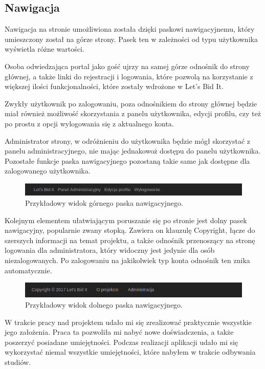 \documentclass[brudnopis]{xmgr}
\begin{document}
\subsection{Nawigacja}

Nawigacja na stronie umożliwiona została dzięki paskowi nawigacyjnemu, który umieszczony został na górze strony. Pasek ten w zależności od typu użytkownika wyświetla różne wartości.

Osoba odwiedzająca portal jako gość ujrzy na samej górze odnośnik do strony głównej, a także linki do rejestracji i logowania, które pozwolą na korzystanie z większej ilości funkcjonalności, które zostały wdrożone w Let's Bid It.

Zwykły użytkownik po zalogowaniu, poza odnośnikiem do strony głównej będzie miał również możliwość skorzystania z panelu użytkownika, edycji profilu, czy też po prostu z opcji wylogowania się z aktualnego konta.

Administrator strony, w odróżnieniu do użytkownika będzie mógł skorzystać z panelu administracyjnego, nie mając jednakowoż dostępu do panelu użytkownika. Pozostałe funkcje paska nawigacyjnego pozostaną takie same jak dostępne dla zalogowanego użytkownika.

\begin{figure}[!tbh]
\centering
\includegraphics[width=\linewidth]{fig/pasek}
\caption{Przykładowy widok górnego paska nawigacyjnego.}
\end{figure}

Kolejnym elementem ułatwiającym poruszanie się po stronie jest dolny pasek nawigacyjny, popularnie zwany stopką. Zawiera on klauzulę Copyright, łącze do szerszych informacji na temat projektu, a także odnośnik przenoszący na stronę logowania dla administratora, który widoczny jest jedynie dla osób niezalogowanych. Po zalogowaniu na jakikolwiek typ konta odnośnik ten znika automatycznie.
\begin{figure}[!tbh]
\centering
\includegraphics[width=\linewidth]{fig/stopka}
\caption{Przykładowy widok dolnego paska nawigacyjnego.}
\end{figure}


\summary
W trakcie pracy nad projektem udało mi się zrealizować praktycznie wszystkie jego założenia. Praca ta pozwoliła mi nabyć nowe doświadczenia, a także poszerzyć posiadane umiejętności. Podczas realizacji aplikacji udało mi się wykorzystać niemal wszystkie umiejętności, które nabyłem w trakcie odbywania studiów.
\end{document}
